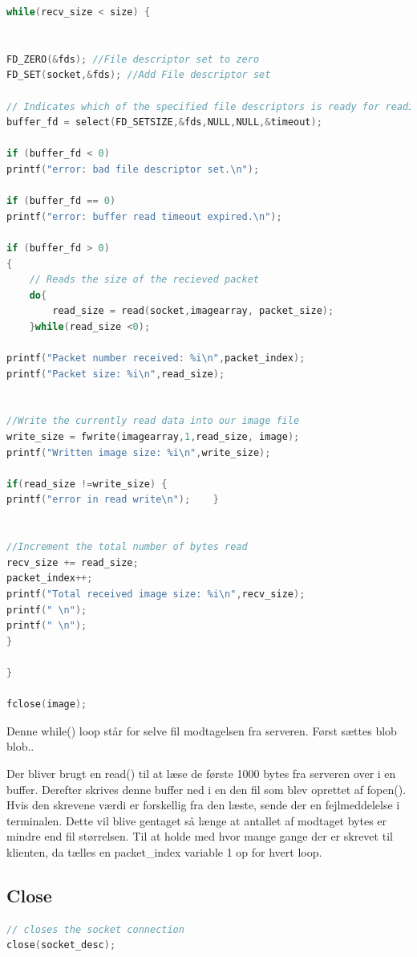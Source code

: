 \documentclass[12pt,fleqn,a4paper]{report}
\begin{document}
\begin{framed}
\begin{lstlisting}[language=C++]
while(recv_size < size) {
	
	
FD_ZERO(&fds); //File descriptor set to zero
FD_SET(socket,&fds); //Add File descriptor set
	
// Indicates which of the specified file descriptors is ready for reading, writing, or has an error condition pending
buffer_fd = select(FD_SETSIZE,&fds,NULL,NULL,&timeout);
	
if (buffer_fd < 0)
printf("error: bad file descriptor set.\n");
	
if (buffer_fd == 0)
printf("error: buffer read timeout expired.\n");
	
if (buffer_fd > 0)
{
	// Reads the size of the recieved packet
	do{
		read_size = read(socket,imagearray, packet_size);
	}while(read_size <0);
	
printf("Packet number received: %i\n",packet_index);
printf("Packet size: %i\n",read_size);
	
	
//Write the currently read data into our image file
write_size = fwrite(imagearray,1,read_size, image);
printf("Written image size: %i\n",write_size);

if(read_size !=write_size) {
printf("error in read write\n");    }
	
	
//Increment the total number of bytes read
recv_size += read_size;
packet_index++;
printf("Total received image size: %i\n",recv_size);
printf(" \n");
printf(" \n");
}

}

fclose(image);
\end{lstlisting}
\end{framed}

Denne while() loop står for selve fil modtagelsen fra serveren. Først sættes blob blob..

Der bliver brugt en read() til at læse de første 1000 bytes fra serveren over i en buffer. Derefter skrives denne buffer ned i en den fil som blev oprettet af fopen(). Hvis den skrevene værdi er forskellig fra den læste, sende der en fejlmeddelelse i terminalen. Dette vil blive gentaget så længe at antallet af modtaget bytes er mindre end fil størrelsen.
Til at holde med hvor mange gange der er skrevet til klienten, da tælles en packet\_index variable 1 op for hvert loop.

\subsection{Close}
\begin{framed}
\begin{lstlisting}[language=C++]
// closes the socket connection
close(socket_desc);
\end{lstlisting}
\end{framed}
\end{document}
